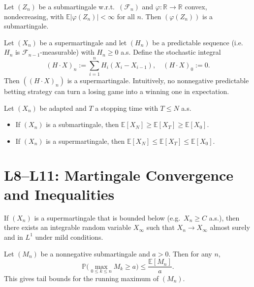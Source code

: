 \documentclass[answers,12pt,addpoints]{exam}
\begin{document}
\begin{lemma}
Let $(Z_n)$ be a submartingale w.r.t.\ $(\mathcal{F}_n)$ and $\varphi:\mathbb{R}\to\mathbb{R}$ convex, nondecreasing, with $\mathbb{E}|\varphi(Z_n)|<\infty$ for all $n$. Then $(\varphi(Z_n))$ is a submartingale.
\end{lemma}

\begin{theorem}
Let $(X_n)$ be a supermartingale and let $(H_n)$ be a predictable sequence (i.e.\ $H_n$ is $\mathcal{F}_{n-1}$-measurable) with $H_n\ge 0$ a.s. Define the stochastic integral
\[
(H\cdot X)_n := \sum_{i=1}^n H_i (X_i - X_{i-1}), \quad (H\cdot X)_0 := 0.
\]
Then $((H\cdot X)_n)$ is a supermartingale. Intuitively, no nonnegative predictable betting strategy can turn a losing game into a winning one in expectation.
\end{theorem}

\begin{theorem}
Let $(X_n)$ be adapted and $T$ a stopping time with $T\le N$ a.s.
\begin{itemize}
\item If $(X_n)$ is a submartingale, then $\mathbb{E}[X_N]\ge \mathbb{E}[X_T]\ge \mathbb{E}[X_0]$.
\item If $(X_n)$ is a supermartingale, then $\mathbb{E}[X_N]\le \mathbb{E}[X_T]\le \mathbb{E}[X_0]$.
\end{itemize}
\end{theorem}

\section{L8–L11: Martingale Convergence and Inequalities}

\begin{theorem}
If $(X_n)$ is a supermartingale that is bounded below (e.g.\ $X_n\ge C$ a.s.), then there exists an integrable random variable $X_\infty$ such that $X_n\to X_\infty$ almost surely and in $L^1$ under mild conditions.
\end{theorem}

\begin{definition}
Let $(M_n)$ be a nonnegative submartingale and $a>0$. Then for any $n$,
\[
\mathbb{P}\Big(\max_{0\le k\le n} M_k \ge a\Big) \le \frac{\mathbb{E}[M_n]}{a}.
\]
This gives tail bounds for the running maximum of $(M_n)$.
\end{definition}
\end{document}
